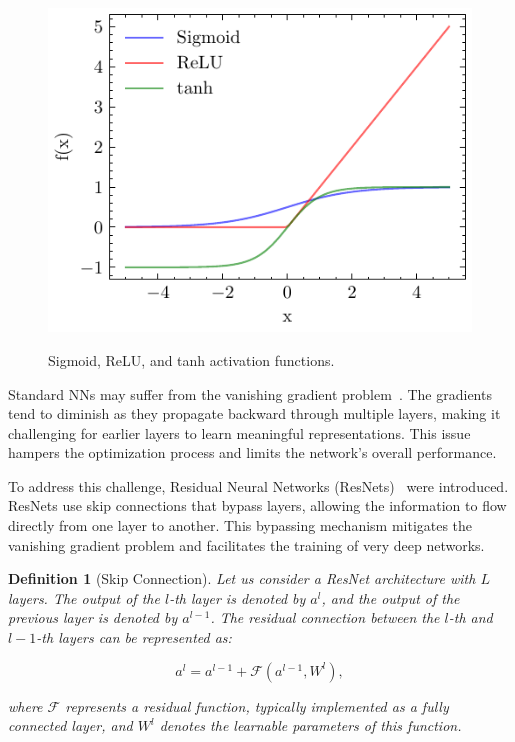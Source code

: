 \documentclass[ppgc,diss,english]{iiufrgs}
\newtheorem{definition}{Definition}
\begin{document}
\begin{figure}[ht]
\caption{Sigmoid, ReLU, and tanh activation functions.}
\vspace{\baselineskip}
\centering
\includegraphics[]{img/sigmoid-relu-tanh}
\label{fig:activation-functions}
\end{figure}

Standard NNs may suffer from the vanishing gradient problem~\cite{Bengio.etal/1994}. The gradients tend to diminish as they propagate backward through multiple layers, making it challenging for earlier layers to learn meaningful representations. This issue hampers the optimization process and limits the network's overall performance.

To address this challenge, Residual Neural Networks (ResNets)~\cite{He.etal/2016} were introduced. ResNets use skip connections that bypass layers, allowing the information to flow directly from one layer to another. This bypassing mechanism mitigates the vanishing gradient problem and facilitates the training of very deep networks.

\begin{definition}[Skip Connection]
Let us consider a ResNet architecture with $L$ layers. The output of the $l$-th layer is denoted by $a^{l}$, and the output of the previous layer is denoted by $a^{l-1}$. The residual connection between the $l$-th and $l-1$-th layers can be represented as:

$$a^{l} = a^{l-1} + \mathcal{F}(a^{l-1}, W^{l}),$$

where $\mathcal{F}$ represents a residual function, typically implemented as a fully connected layer, and $W^{l}$ denotes the learnable parameters of this function.
\end{definition}
\end{document}
